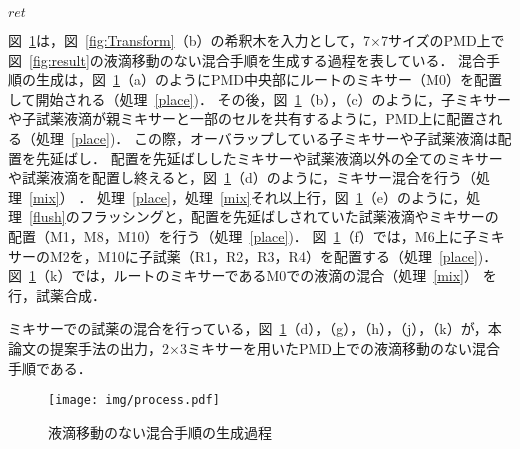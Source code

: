\begin{algorithm}[tbp]
\begin{algorithmic}[1]
     \Return $\mathit{ret}$
     \EndFunction
 \end{algorithmic}
\end{algorithm}


図~\ref{fig:process}は，図~\ref{fig:Transform}（b）の希釈木を入力として，7$\times$7サイズのPMD上で図~\ref{fig:result}の液滴移動のない混合手順を生成する過程を表している．
混合手順の生成は，図~\ref{fig:process}（a）のようにPMD中央部にルートのミキサー（M0）を配置して開始される（処理~\ref{place})．
その後，図~\ref{fig:process}（b），（c）のように，子ミキサーや子試薬液滴が親ミキサーと一部のセルを共有するように，PMD上に配置される（処理~\ref{place})．
この際，オーバラップしている子ミキサーや子試薬液滴は配置を先延ばし． 配置を先延ばししたミキサーや試薬液滴以外の全てのミキサーや試薬液滴を配置し終えると，図~\ref{fig:process}（d）のように，ミキサー混合を行う（処理~\ref{mix}） ．
処理~\ref{place}，処理~\ref{mix}それ以上行，図~\ref{fig:process}（e）のように，処理~\ref{flush}のフラッシングと，配置を先延ばしされていた試薬液滴やミキサーの配置（M1，M8，M10）を行う（処理~\ref{place})．
図~\ref{fig:process}（f）では，M6上に子ミキサーのM2を，M10に子試薬（R1，R2，R3，R4）を配置する（処理~\ref{place})．
図~\ref{fig:process}（k）では，ルートのミキサーであるM0での液滴の混合（処理~\ref{mix}） を行，試薬合成．

ミキサーでの試薬の混合を行っている，図~\ref{fig:process}（d），（g），（h），（j），（k）が，本論文の提案手法の出力，2$\times$3ミキサーを用いたPMD上での液滴移動のない混合手順である． \begin{figure}[tbp]
 \centering\texttt{[image: img/process.pdf]}
 \caption{液滴移動のない混合手順の生成過程}\label{fig:process}
\end{figure}






